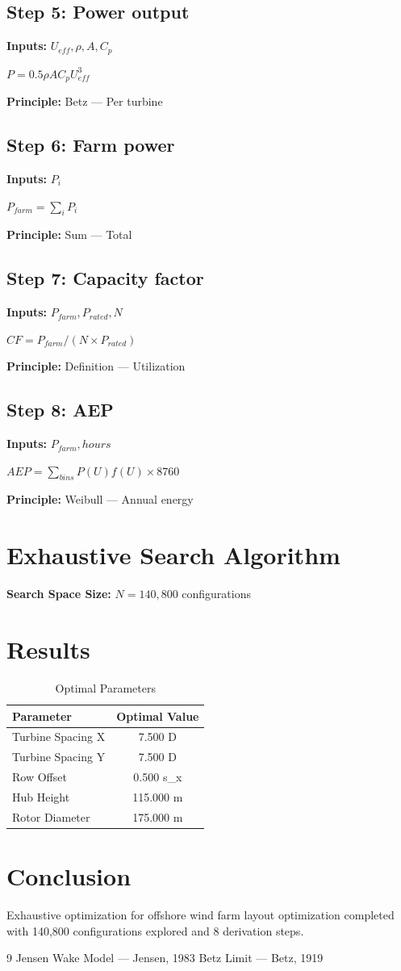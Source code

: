 \documentclass[11pt,twocolumn]{article}
\begin{document}
\subsection*{Step 5: Power output}
\textbf{Inputs:} $U_{eff}, \rho, A, C_p$

$P = 0.5 \rho A C_p U_{eff}^3$

\textbf{Principle:} Betz --- Per turbine

\subsection*{Step 6: Farm power}
\textbf{Inputs:} $P_i$

$P_{farm} = \sum_i P_i$

\textbf{Principle:} Sum --- Total

\subsection*{Step 7: Capacity factor}
\textbf{Inputs:} $P_{farm}, P_{rated}, N$

$CF = P_{farm}/(N \times P_{rated})$

\textbf{Principle:} Definition --- Utilization

\subsection*{Step 8: AEP}
\textbf{Inputs:} $P_{farm}, hours$

$AEP = \sum_{bins} P(U) f(U) \times 8760$

\textbf{Principle:} Weibull --- Annual energy


\section{Exhaustive Search Algorithm}

\textbf{Search Space Size:} $N = 140,800$ configurations

\section{Results}

\begin{table}[h]
\centering
\caption{Optimal Parameters}
\begin{tabular}{@{}lc@{}}
\toprule
Parameter & Optimal Value \\
\midrule
Turbine Spacing X & 7.500 D \\
Turbine Spacing Y & 7.500 D \\
Row Offset & 0.500 s_x \\
Hub Height & 115.000 m \\
Rotor Diameter & 175.000 m \\
\bottomrule
\end{tabular}
\end{table}

\section{Conclusion}
Exhaustive optimization for offshore wind farm layout optimization completed with 140,800 configurations explored and 8 derivation steps.

\begin{thebibliography}{9}
 Jensen Wake Model --- Jensen, 1983
 Betz Limit --- Betz, 1919
\end{thebibliography}
\end{document}
